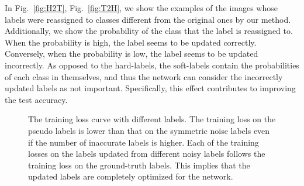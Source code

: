 \documentclass[10pt,twocolumn,letterpaper]{article}
\newcommand{\Fref}[1]{Fig.~\ref{#1}}
\begin{document}
In \Fref{fig:H2T}, \Fref{fig:T2H}, we show the examples of the images whose labels were reassigned to classes different from the original ones by our method. Additionally, we show the probability of the class that the label is reassigned to.
When the probability is high, the label seems to be updated correctly. Conversely, when the probability is low, the label seems to be updated incorrectly. As opposed to the hard-labels, the soft-labels contain the probabilities of each class in themselves, and thus the network can consider the incorrectly updated labels as not important. Specifically, this effect contributes to improving the test accuracy.

\begin{figure}[tb]
  \vspace{-5mm}
  \centering
  \caption{The training loss curve with different labels. The training loss on the pseudo labels is lower than that on the symmetric noise labels even if the number of inaccurate labels is higher. Each of the training losses on the labels updated from different noisy labels follows the training loss on the ground-truth labels. This implies that the updated labels are completely optimized for the network.}
  \label{fig:trans_l}
\end{figure}

\begin{table}[tb]
  \caption{Test accuracy of different baselines on the Clothing1M dataset. \#1 and \#2 are quoted from~\cite{patrini2016making}, and \#3 is the reproduced result by our reimplementation.}
  \vspace{-2mm}
  \begin{center}
  \end{center}
  \label{tab:cloth}
  \vspace{-3mm}
\end{table}
\end{document}
